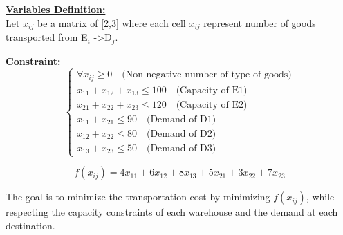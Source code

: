\vspace{0.5cm}
\begin{minipage}[t]{0.45\textwidth}
    \textbf{\underline{Variables Definition:}} \\[1em] %

   
Let \(x_{ij}\) be a matrix of [2,3] where each cell \(x_{ij}\) represent number of goods transported from E$_{i}$
-\textgreater D$_{j}$. \\
    
\end{minipage}%
\hfill %
\begin{minipage}[t]{0.45\textwidth}
    \textbf{\underline{Constraint:}} \\[1em]
    \[
    \left\{
        \begin{array}{l}
            \forall x_{ij} \geq 0 \quad \text{(Non-negative number of type of goods)}\\
            x_{11} + x_{12} + x_{13}   \leq 100 \quad \text{(Capacity of E1)}\\
            x_{21} + x_{22} + x_{23} \leq 120 \quad \text{(Capacity of E2)}\\
            x_{11} + x_{21} \leq 90 \quad \text{(Demand of D1)}\\
            x_{12} + x_{22} \leq 80 \quad \text{(Demand of D2)}\\
            x_{13} + x_{23} \leq 50 \quad \text{(Demand of D3)}
        \end{array}
    \right.
    \]
\end{minipage}
\vspace{0.5cm}

\begin{tcolorbox}[title = Objective Function]
\[
    f(x_{ij}) = 4x_{11} + 6x_{12} + 8x_{13} + 5x_{21} + 3x_{22} + 7x_{23} 
\]
\begin{center}
    The goal is to minimize the transportation cost by minimizing \(f(x_{ij})\), while respecting the capacity constraints of
each warehouse and the demand at each destination.
\end{center}
\end{tcolorbox}

